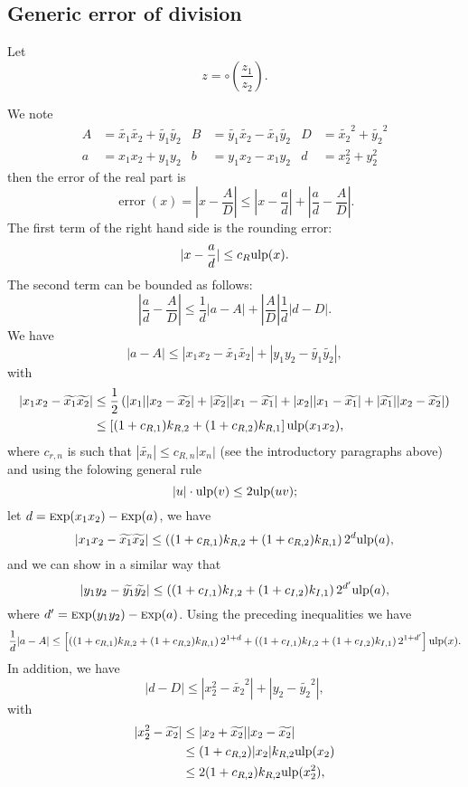 \documentclass {article}
\DeclareMathOperator{\error}{error}
\newcommand {\Ulp}{{\rm ulp}}
\newcommand {\Exp}{{\rm \textsc exp}}
\begin{document}
\subsection {Generic error of division}

Let
\[
z=\circ(\frac{z_1}{z_2}).
\]

We note
\begin{align*}
A&=\widetilde{x_1}\widetilde{x_2}+\widetilde{y_1}\widetilde{y_2}&
B&=\widetilde{y_1}\widetilde{x_2}-\widetilde{x_1}\widetilde{y_2}&
D&=\widetilde{x_2}^2+\widetilde{y_2}^2\\
a&=x_1x_2+y_1y_2&
b&=y_1x_2-x_1y_2&
d&=x_2^2+y_2^2
\end{align*}
then the error of the real part is
\[
\error(x) = |x-\frac{A}{D}| \leq |x-\frac{a}{d}| + |\frac{a}{d}-\frac{A}{D}|.
\]
The first term of the right hand side is the rounding error:
\[
|x-\frac{a}{d}|\leq c_R \Ulp(x).
\]
The second term can be bounded as follows:
\[
|\frac{a}{d}-\frac{A}{D}| \leq \frac{1}{d} |a-A|
+\left|\frac{A}{D}\right|\frac{1}{d}|d-D|.
\]
We have
\[
|a-A| \leq |x_1x_2-\widetilde{x_1}\widetilde{x_2}|
+|y_1y_2-\widetilde{y_1}\widetilde{y_2}|,
\]
with
\begin{align*}
|x_1x_2-\widetilde{x_1}\widetilde{x_2}| &\leq \frac{1}{2} \left(
|x_1||x_2-\widetilde{x_2}|+|\widetilde{x_2}||x_1-\widetilde{x_1}|
+|x_2||x_1-\widetilde{x_1}|+|\widetilde{x_1}||x_2-\widetilde{x_2}| \right)\\
&\leq \left[ (1+c_{R,1})k_{R,2}+(1+c_{R,2})k_{R,1} \right] \Ulp(x_1x_2),
\end{align*}
where $c_{r,n}$ is such that $|\widetilde{x_n}| \leq c_{R,n} |x_n|$ (see the
introductory paragraphs above) and using the folowing general rule
\[
|u|\cdot\Ulp(v) \leq 2\Ulp(uv);
\]
let $d=\Exp(x_1x_2)-\Exp(a)$, we have
\[
|x_1x_2-\widetilde{x_1}\widetilde{x_2}| \leq 
\left((1+c_{R,1})k_{R,2}+(1+c_{R,2})k_{R,1}\right)2^d \Ulp(a),
\]
and we can show in a similar way that
\[
|y_1y_2-\widetilde{y_1}\widetilde{y_2}| \leq \left( (1+c_{I,1})k_{I,2}
+(1+c_{I,2})k_{I,1} \right)2^{d'} \Ulp(a),
\]
where $d'=\Exp(y_1y_2)-\Exp(a)$. Using the preceding inequalities we have
\[
\frac{1}{d}|a-A| \leq \left[
\left((1+c_{R,1})k_{R,2}+(1+c_{R,2})k_{R,1}\right)2^{1+d}
+\left((1+c_{I,1})k_{I,2}+(1+c_{I,2})k_{I,1}\right)2^{1+d'}
\right] \Ulp(x).
\]
In addition, we have
\[
|d-D| \leq |x_2^2-\widetilde{x_2}^2| + |y_2-\widetilde{y_2}^2|,
\]
with
\begin{align*}
|x_2^2-\widetilde{x_2}| &\leq |x_2+\widetilde{x_2}||x_2-\widetilde{x_2}|\\
&\leq (1+c_{R,2})|x_2|k_{R,2} \Ulp(x_2)\\
&\leq 2(1+c_{R,2})k_{R,2}\Ulp(x_2^2),
\end{align*}
\end{document}

